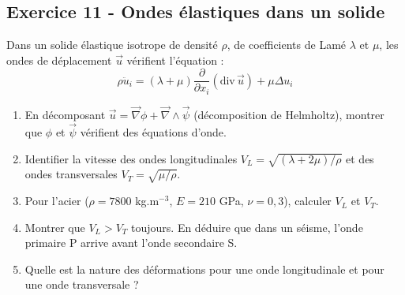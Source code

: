 \documentclass[12pt,a4paper]{article}
\begin{document}
\subsection*{Exercice 11 - Ondes élastiques dans un solide \niveau{\difficile}}

\begin{boiteexercice}
Dans un solide élastique isotrope de densité $\rho$, de coefficients de Lamé $\lambda$ et $\mu$, les ondes de déplacement $\vec{u}$ vérifient l'équation :
\[
\rho\ddot{u}_i = (\lambda+\mu)\frac{\partial}{\partial x_i}(\text{div}\,\vec{u}) + \mu\Delta u_i
\]
\begin{enumerate}
  \item En décomposant $\vec{u} = \vec{\nabla}\phi + \vec{\nabla}\wedge\vec{\psi}$ (décomposition de Helmholtz), montrer que $\phi$ et $\vec{\psi}$ vérifient des équations d'onde.
  \item Identifier la vitesse des ondes longitudinales $V_L = \sqrt{(\lambda+2\mu)/\rho}$ et des ondes transversales $V_T = \sqrt{\mu/\rho}$.
  \item Pour l'acier ($\rho = 7800$ kg.m$^{-3}$, $E = 210$ GPa, $\nu = 0{,}3$), calculer $V_L$ et $V_T$.
  \item Montrer que $V_L > V_T$ toujours. En déduire que dans un séisme, l'onde primaire P arrive avant l'onde secondaire S.
  \item Quelle est la nature des déformations pour une onde longitudinale et pour une onde transversale ?
\end{enumerate}
\end{boiteexercice}
\end{document}
